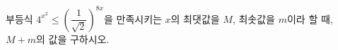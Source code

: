 부등식 $4^{x^{2}}\le\left(\dfrac{1}{\sqrt{2}}\right)^{8x}$을 만족시키는 $x$의 최댓값을 $M$, 최솟값을 $m$이라 할 때, $M+m$의 값을 구하시오.

